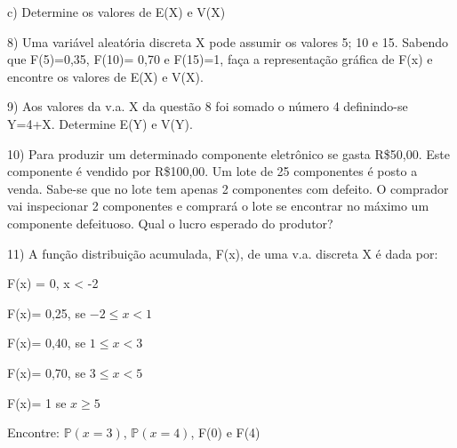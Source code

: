\documentclass[12pt,a4paper]{article}
\begin{document}
c) Determine os valores de E(X) e V(X)

\vspace{1cm}
8) Uma variável aleatória discreta X pode assumir os valores 5; 10 e 15. Sabendo que F(5)=0,35, F(10)= 0,70 e F(15)=1, faça a representação gráfica de F(x) e encontre os valores de E(X) e V(X).

\vspace{1cm}
9) Aos valores da v.a. X da questão 8 foi somado o número 4 definindo-se Y=4+X. Determine E(Y) e V(Y).

\vspace{1cm}
10) Para produzir um determinado componente eletrônico se gasta R\$50,00. Este componente é vendido por R\$100,00. Um lote de 25 componentes é posto a venda. Sabe-se que no lote tem apenas 2 componentes com defeito. O comprador vai inspecionar 2 componentes e comprará o lote se encontrar no máximo um componente defeituoso. Qual o lucro esperado do produtor?

\vspace{1cm}
11) A função distribuição acumulada, F(x), de uma v.a. discreta X é dada por:

F(x) = 0, x < -2

F(x)= 0,25, se $-2\leq{x}< 1$

F(x)= 0,40, se  $1\leq{x}< 3$

F(x)= 0,70, se $3\leq{x}< 5$

F(x)= 1 se $x\geq{5}$

Encontre: $\mathbb{P}(x=3)$, $\mathbb{P}(x=4)$, F(0) e F(4) 
\end{document}
